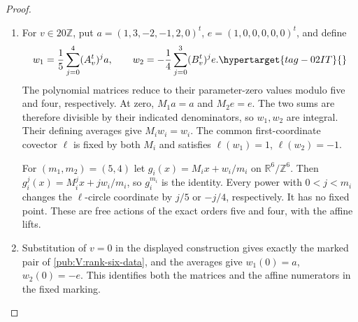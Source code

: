 \documentclass[11pt,a4paper]{article}
\numberwithin{equation}{section}
\theoremstyle{definition}
\begin{document}
\begin{proof}
\begin{enumerate}[label=\arabic*.]
At $v=0$ the symmetric matrix
$Q_{ij}=1$ for $j-i\equiv1,4\pmod5$ and $Q_{ij}=0$ otherwise
has determinant two and satisfies $A^tQA=Q$, $B_0^tQB_0=Q$.
It gives the equivariant isomorphism in that case.

For the rank-six matrices, the same word has trace
\[
 h(v):=\operatorname{tr}(A_vB_v^{-1})=2-v^2q,
 \qquad h(v+1)-h(v)=-4v^3-3v^2-3v-1.
\]
Thus $h$ is strictly decreasing on the nonnegative integers,
in particular on the nonnegative multiples of twenty.
A simultaneous rational conjugacy of the ordered matrices
would preserve this trace. There are consequently infinitely
many such rational conjugacy classes already in that subfamily.

\item For $v\in20\mathbb Z$, put
$a=(1,3,-2,-1,2,0)^t$, $e=(1,0,0,0,0,0)^t$, and define
\begin{equation}
 w_1=\frac15\sum_{j=0}^4(A_v^t)^j a,
 \qquad
 w_2=-\frac14\sum_{j=0}^3(B_v^t)^j e.
 \hypertarget{tag-02IT}{}\label{maps:eq:F.U7}
\end{equation}
The polynomial matrices reduce to their parameter-zero
values modulo five and four, respectively. At zero,
$M_1a=a$ and $M_2e=e$. The two sums are therefore divisible
by their indicated denominators, so $w_1,w_2$ are integral.
Their defining averages give $M_iw_i=w_i$. The common
first-coordinate covector $\ell$ is fixed by both $M_i$ and
satisfies $\ell(w_1)=1$, $\ell(w_2)=-1$.

For $(m_1,m_2)=(5,4)$ let
$g_i(x)=M_ix+w_i/m_i$ on $\mathbb R^6/\mathbb Z^6$.
Then $g_i^j(x)=M_i^jx+jw_i/m_i$, so $g_i^{m_i}$ is the
identity. Every power with $0<j<m_i$ changes the $\ell$-circle coordinate by $j/5$ or $-j/4$, respectively.
It has no fixed point. These are free actions of the exact
orders five and four, with the affine lifts.

\item Substitution of $v=0$ in the displayed construction gives
exactly the marked pair of \cref{pub:V:rank-six-data}, and
the averages give $w_1(0)=a$, $w_2(0)=-e$. This identifies
both the matrices and the affine numerators in the fixed marking.

\end{enumerate}
\end{proof}
\end{document}
